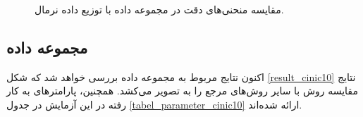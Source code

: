 \begin{figure}[t]
	\centering
	\hspace{0.8mm}
	\caption{
		مقایسه منحنی‌های دقت در مجموعه داده
		با توزیع داده نرمال.
	}
	\label{result_cifar10_normal}
\end{figure}




\FloatBarrier
\subsection{
	مجموعه داده
}

اکنون نتایج مربوط به مجموعه داده
بررسی خواهد شد که شکل
\ref{result_cinic10}
نتایج مقایسه روش
با سایر روش‌های مرجع را به تصویر می‌کشد.
همچنین، پارامترهای به کار رفته در این آزمایش در جدول
\ref{tabel_parameter_cinic10}
ارائه شده‌اند.

